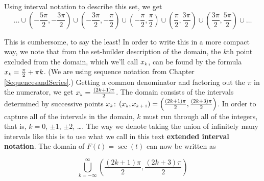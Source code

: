 Using interval notation to describe this set, we get  \[ \ldots \cup \left( -\frac{5\pi}{2}, -\frac{3\pi}{2}\right) \cup \left( -\frac{3\pi}{2}, -\frac{\pi}{2}\right) \cup  \left(-\frac{\pi}{2}, \frac{\pi}{2}\right) \cup \left(\frac{\pi}{2}, \frac{3\pi}{2}\right) \cup  \left(\frac{3\pi}{2}, \frac{5\pi}{2}\right) \cup \ldots \]

This is cumbersome, to say the least!  In order to write this in a more compact way, we note that from the set-builder description of the domain, the $k$th point excluded from the domain, which we'll call $x_{\mbox{\tiny $k$}}$, can be found by the formula $x_{\mbox{\tiny $k$}} =  \frac{\pi}{2} + \pi k$.  (We are using sequence notation from Chapter \ref{SequencesandSeries}.)  Getting a common denominator and factoring out the $\pi$ in the numerator, we get  $x_{\mbox{\tiny $k$}} = \frac{(2k+1)\pi}{2}$.  The domain consists of the intervals determined by successive points $x_{\mbox{\tiny $k$}}$:   $\left(x_{\mbox{\tiny $k$}}, x_{\mbox{\tiny $k+1$}}\right) = \left( \frac{(2k+1)\pi}{2},  \frac{(2k+3)\pi}{2}\right)$.  In order to capture all of the intervals in the domain, $k$ must run through all of the integers, that is, $k = 0$, $\pm 1$, $\pm 2$, \ldots.  The way we denote taking the union of infinitely many intervals like this is to use what we call in this text \textbf{extended interval notation}.  The domain of $F(t) = \sec(t)$ can now be written as

\[ \bigcup_{k = -\infty}^{\infty} \left( \frac{(2k+1)\pi}{2}, \frac{(2k+3) \pi}{2} \right) \]

\label{extendedinterval}

